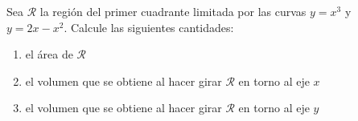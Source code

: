 \item Sea $\mathscr{R}$ la región del primer cuadrante limitada por las curvas $y = x^3$ y $y = 2x - x^2$. Calcule las siguientes cantidades:
\begin{enumerate}
    \item[(a)] el área de $\mathscr{R}$
    \item[(b)] el volumen que se obtiene al hacer girar $\mathscr{R}$ en torno al eje $x$
    \item[(c)] el volumen que se obtiene al hacer girar $\mathscr{R}$ en torno al eje $y$
\end{enumerate}
